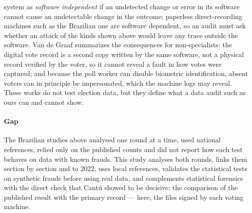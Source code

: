 \documentclass[fleqn,10pt]{SelfArx}
\begin{document}
system as \emph{software independent} if an undetected change or error in
its software cannot cause an undetectable change in the outcome; paperless
direct-recording machines such as the Brazilian one are software dependent,
so an audit must ask whether an attack of the kinds shown above would leave
any trace outside the software. Van de Graaf \cite{vandegraaf2017}
summarizes the consequences for non-specialists: the digital vote record is
a second copy written by the same software, not a physical record verified
by the voter, so it cannot reveal a fault in how votes were captured; and
because the poll worker can disable biometric identification, absent voters
can in principle be impersonated, which the machine logs may reveal. These
works do not test election data, but they define what a data audit such as
ours can and cannot show.

\paragraph{Gap} The Brazilian studies above analysed one round at a time,
used national references, relied only on the published counts and did not
report how each test behaves on data with known frauds. This study analyses
both rounds, links them section by section and to 2022, uses local
references, validates the statistical tests on synthetic frauds before using
real data, and complements statistical forensics with the direct check that
Cant\'u \cite{cantu2019} showed to be decisive: the comparison of the
published result with the primary record --- here, the files signed by each
voting machine.
\end{document}
